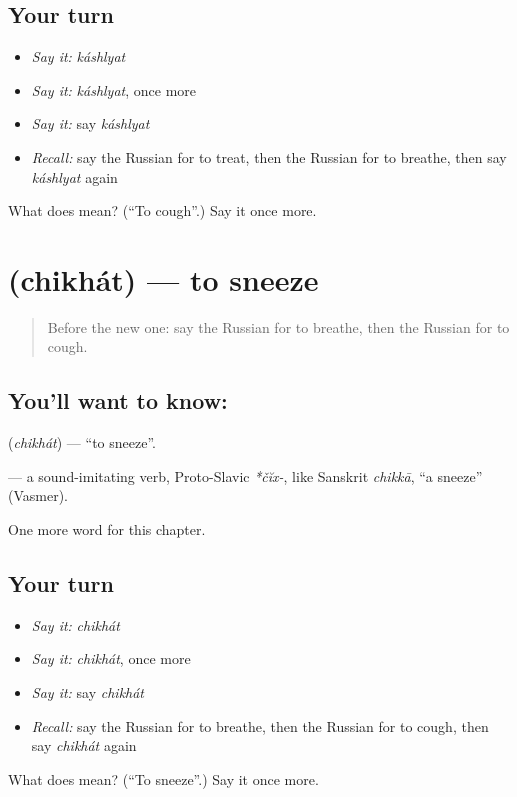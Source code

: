 \subsection*{Your turn}
\begin{itemize}
\raggedright
  \item \emph{Say it:} \emph{káshlyat}
  \item \emph{Say it:} \emph{káshlyat}, once more
  \item \emph{Say it:} say \emph{káshlyat}
  \item \emph{Recall:} say the Russian for to treat, then the Russian for to breathe, then say \emph{káshlyat} again
\end{itemize}

\begin{tcolorbox}[breakable,colback=teal!4,colframe=teal!35!black,title={Before you move on}]
What does  mean? (\textquotedblleft{}To cough\textquotedblright{}.) Say it once more.
\end{tcolorbox}
\section[\texorpdfstring{\ru{чихать} (chikhát)}{чихать (chikhát)}]{ (chikhát) — to sneeze}

\label{lesson:RU-C207-chikhat}



\begin{quote}
Before the new one: say the Russian for to breathe, then the Russian for to cough.
\end{quote}

\subsection*{You'll want to know: }
\textbf{} (\emph{chikhát}) — \textquotedblleft{}to sneeze\textquotedblright{}.

\begin{cousinweb}
\textbf{} — a sound-imitating verb, Proto-Slavic \emph{*čĭx-}, like Sanskrit \emph{chikkā}, \textquotedblleft{}a sneeze\textquotedblright{} (Vasmer).
\end{cousinweb}

\begin{grammarlens}[title={What you've built}]
One more word for this chapter.
\end{grammarlens}

\subsection*{Your turn}
\begin{itemize}
\raggedright
  \item \emph{Say it:} \emph{chikhát}
  \item \emph{Say it:} \emph{chikhát}, once more
  \item \emph{Say it:} say \emph{chikhát}
  \item \emph{Recall:} say the Russian for to breathe, then the Russian for to cough, then say \emph{chikhát} again
\end{itemize}

\begin{tcolorbox}[breakable,colback=teal!4,colframe=teal!35!black,title={Before you move on}]
What does  mean? (\textquotedblleft{}To sneeze\textquotedblright{}.) Say it once more.
\end{tcolorbox}
